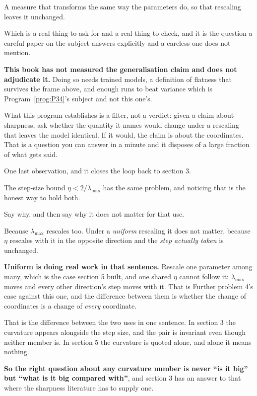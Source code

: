 \begin{fr}
\begin{ansblock}
A measure that transforms the same way the parameters do, so that rescaling
leaves it unchanged.
\end{ansblock}

Which is a real thing to ask for and a real thing to check, and it is the
question a careful paper on the subject answers explicitly and a careless one
does not mention.

\begin{warning}
\textbf{This book has not measured the generalisation claim and does not
adjudicate it.} Doing so needs trained models, a definition of flatness that
survives the frame above, and enough runs to beat variance \dash{} which is
Program~\ref{prog:P34}'s subject and not this one's.

What this program establishes is a filter, not a verdict: given a claim about
sharpness, ask whether the quantity it names would change under a rescaling
that leaves the model identical. If it would, the claim is about the
coordinates. That is a question you can answer in a minute and it disposes of
a large fraction of what gets said.
\end{warning}
\end{fr}

\begin{fr}
One last observation, and it closes the loop back to section 3.

The step-size bound $\eta < 2/\lambda_{\max}$ has the same problem, and
noticing that is the honest way to hold both.

Say why, and then say why it does not matter for that use.
\dotline
\nextframe
\end{fr}

\begin{fr}
\begin{ansblock}
Because $\lambda_{\max}$ rescales too. Under a \emph{uniform} rescaling it does
not matter, because $\eta$ rescales with it in the opposite direction and the
\emph{step actually taken} is unchanged.
\end{ansblock}

\textbf{Uniform is doing real work in that sentence.} Rescale one parameter
among many, which is the case section 5 built, and one shared $\eta$ cannot
follow it: $\lambda_{\max}$ moves and every other direction's step moves with
it. That is Further problem 4's case against this one, and the difference
between them is whether the change of coordinates is a change of \emph{every}
coordinate.

That is the difference between the two uses in one sentence. In section 3 the
curvature appears alongside the step size, and the pair is invariant even
though neither member is. In section 5 the curvature is quoted alone, and
alone it means nothing.

\textbf{So the right question about any curvature number is never \enquote{is
it big} but \enquote{what is it big compared with}}, and section 3 has an
answer to that where the sharpness literature has to supply one.
\end{fr}

